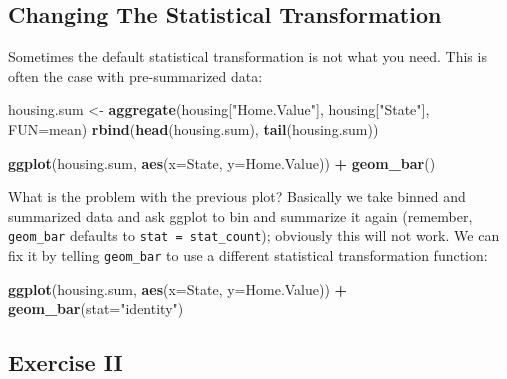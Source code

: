 \documentclass[]{book}
\newenvironment{Shaded}{\begin{snugshade}}{\end{snugshade}}
\newcommand{\KeywordTok}[1]{\textcolor[rgb]{0.13,0.29,0.53}{\textbf{#1}}}
\newcommand{\DataTypeTok}[1]{\textcolor[rgb]{0.13,0.29,0.53}{#1}}
\newcommand{\StringTok}[1]{\textcolor[rgb]{0.31,0.60,0.02}{#1}}
\newcommand{\OperatorTok}[1]{\textcolor[rgb]{0.81,0.36,0.00}{\textbf{#1}}}
\newcommand{\NormalTok}[1]{#1}
\begin{document}
\subsection{Changing The Statistical
Transformation}\label{changing-the-statistical-transformation}

Sometimes the default statistical transformation is not what you need.
This is often the case with pre-summarized data:

\begin{Shaded}
\begin{Highlighting}[]
\NormalTok{housing.sum <-}\StringTok{ }\KeywordTok{aggregate}\NormalTok{(housing[}\StringTok{"Home.Value"}\NormalTok{], housing[}\StringTok{"State"}\NormalTok{], }\DataTypeTok{FUN=}\NormalTok{mean)}
\KeywordTok{rbind}\NormalTok{(}\KeywordTok{head}\NormalTok{(housing.sum), }\KeywordTok{tail}\NormalTok{(housing.sum))}
\end{Highlighting}
\end{Shaded}

\begin{Shaded}
\begin{Highlighting}[]
\KeywordTok{ggplot}\NormalTok{(housing.sum, }\KeywordTok{aes}\NormalTok{(}\DataTypeTok{x=}\NormalTok{State, }\DataTypeTok{y=}\NormalTok{Home.Value)) }\OperatorTok{+}\StringTok{ }
\StringTok{  }\KeywordTok{geom_bar}\NormalTok{()}
\end{Highlighting}
\end{Shaded}

What is the problem with the previous plot? Basically we take binned and
summarized data and ask ggplot to bin and summarize it again (remember,
\texttt{geom\_bar} defaults to \texttt{stat\ =\ stat\_count}); obviously
this will not work. We can fix it by telling \texttt{geom\_bar} to use a
different statistical transformation function:

\begin{Shaded}
\begin{Highlighting}[]
\KeywordTok{ggplot}\NormalTok{(housing.sum, }\KeywordTok{aes}\NormalTok{(}\DataTypeTok{x=}\NormalTok{State, }\DataTypeTok{y=}\NormalTok{Home.Value)) }\OperatorTok{+}\StringTok{ }
\StringTok{  }\KeywordTok{geom_bar}\NormalTok{(}\DataTypeTok{stat=}\StringTok{"identity"}\NormalTok{)}
\end{Highlighting}
\end{Shaded}

\subsection{Exercise II}\label{exercise-ii}
\end{document}
